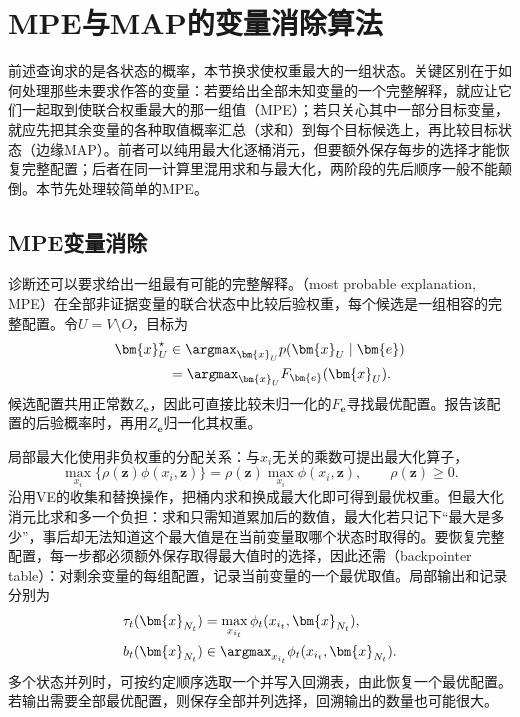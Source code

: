 \section{MPE与MAP的变量消除算法}
\label{sec:pgm-elimination-max-product}

前述查询求的是各状态的概率，本节换求使权重最大的一组状态。关键区别在于如何处理那些未要求作答的变量：若要给出全部未知变量的一个完整解释，就应让它们一起取到使联合权重最大的那一组值（MPE）；若只关心其中一部分目标变量，就应先把其余变量的各种取值概率汇总（求和）到每个目标候选上，再比较目标状态（边缘MAP）。前者可以纯用最大化逐桶消元，但要额外保存每步的选择才能恢复完整配置；后者在同一计算里混用求和与最大化，两阶段的先后顺序一般不能颠倒。本节先处理较简单的MPE。

\subsection{MPE变量消除}
\label{sec:pgm-elimination-mpe}

诊断还可以要求给出一组最有可能的完整解释。（most probable explanation, MPE）在全部非证据变量的联合状态中比较后验权重，每个候选是一组相容的完整配置。令$U=V\setminus O$，目标为
\begin{equation}
  \begin{aligned}
    \bm{x}_U^\star
    &\in\argmax_{\bm{x}_U}p(\bm{x}_U\mid\bm{e})\\
    &=\argmax_{\bm{x}_U}F_{\bm{e}}(\bm{x}_U).
  \end{aligned}
  \label{eq:pgm-elimination-mpe-objective}
\end{equation}
候选配置共用正常数$Z_{\bm{e}}$，因此可直接比较未归一化的$F_{\bm{e}}$寻找最优配置。报告该配置的后验概率时，再用$Z_{\bm{e}}$归一化其权重。

局部最大化使用非负权重的分配关系：与$x_i$无关的乘数可提出最大化算子，
\[
  \max_{x_i}\{\rho(\bm{z})\phi(x_i,\bm{z})\}
  =\rho(\bm{z})\max_{x_i}\phi(x_i,\bm{z}),
  \qquad \rho(\bm{z})\geq0.
\]
沿用VE的收集和替换操作，把桶内求和换成最大化即可得到最优权重。但最大化消元比求和多一个负担：求和只需知道累加后的数值，最大化若只记下“最大是多少”，事后却无法知道这个最大值是在当前变量取哪个状态时取得的。要恢复完整配置，每一步都必须额外保存取得最大值时的选择，因此还需（backpointer table）：对剩余变量的每组配置，记录当前变量的一个最优取值。局部输出和记录分别为
\begin{equation}
  \begin{aligned}
    \tau_t(\bm{x}_{N_t})
      &=\max_{x_{i_t}}\phi_t(x_{i_t},\bm{x}_{N_t}),\\
    b_t(\bm{x}_{N_t})
      &\in\argmax_{x_{i_t}}\phi_t(x_{i_t},\bm{x}_{N_t}).
  \end{aligned}
  \label{eq:pgm-elimination-max-backpointer}
\end{equation}
多个状态并列时，可按约定顺序选取一个并写入回溯表，由此恢复一个最优配置。若输出需要全部最优配置，则保存全部并列选择，回溯输出的数量也可能很大。

